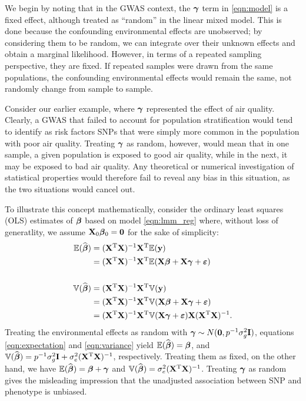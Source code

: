 We begin by noting that in the GWAS context, the $\boldsymbol{\gamma}$ term in \eqref{eqn:model} is a fixed effect, although treated as ``random'' in the linear mixed model.  This is done because the confounding environmental effects are unobserved; by considering them to be random, we can integrate over their unknown effects and obtain a marginal likelihood.  However, in terms of a repeated sampling perspective, they are fixed.  If repeated samples were drawn from the same populations, the confounding environmental effects would remain the same, not randomly change from sample to sample.  

Consider our earlier example, where $\boldsymbol{\gamma}$ represented the effect of air quality.  Clearly, a GWAS that failed to account for population stratification would tend to identify as risk factors SNPs that were simply more common in the population with poor air quality.  Treating $\boldsymbol{\gamma}$ as random, however, would mean that in one sample, a given population is exposed to good air quality, while in the next, it may be exposed to bad air quality.  Any theoretical or numerical investigation of statistical properties would therefore fail to reveal any bias in this situation, as the two situations would cancel out.


To illustrate this concept mathematically, consider the ordinary least squares (OLS) estimates of $\boldsymbol{\beta}{}$ based on model \eqref{eqn:lmm_reg} where, without loss of generatlity, we assume $\mathbf{X}_0 \boldsymbol{\beta}{}_0 = \boldsymbol{0}$ for the sake of simplicity: 
\begin{align}
    \mathbb{E}(\widehat{\boldsymbol{\beta}{}}) &= (\mathbf{X}^{\text{T}} \mathbf{X})^{-1} \mathbf{X}^{\text{T}} \mathbb{E}(\mathbf{y}) \notag \\
    &=  (\mathbf{X}^{\text{T}} \mathbf{X})^{-1} \mathbf{X}^{\text{T}} \mathbb{E}(\mathbf{X}\boldsymbol{\beta}{} + \mathbf{X}\boldsymbol{\gamma} + \boldsymbol{\varepsilon}{}) \label{eqn:expectation}\\
    &\quad \notag\\
    \mathbb{V}(\widehat{\boldsymbol{\beta}{}}) &= (\mathbf{X}^{\text{T}} \mathbf{X})^{-1} \mathbf{X}^{\text{T}} \mathbb{V}(\mathbf{y}) \notag\\
    &=  (\mathbf{X}^{\text{T}} \mathbf{X})^{-1} \mathbf{X}^{\text{T}} \mathbb{V}(\mathbf{X}\boldsymbol{\beta}{} + \mathbf{X}\boldsymbol{\gamma} + \boldsymbol{\varepsilon}{}) \notag\\
    &=  (\mathbf{X}^{\text{T}} \mathbf{X})^{-1} \mathbf{X}^{\text{T}} \mathbb{V}(\mathbf{X}\boldsymbol{\gamma} + \boldsymbol{\varepsilon}{}) \mathbf{X}  (\mathbf{X}^{\text{T}} \mathbf{X})^{-1} \label{eqn:variance}.
\end{align}
Treating the environmental effects as random with $\boldsymbol{\gamma} \sim N(\boldsymbol{0}, p^{-1} \sigma^2_g \mathbf{I})$, equations \eqref{eqn:expectation} and \eqref{eqn:variance} yield $\mathbb{E}(\widehat{\boldsymbol{\beta}{}}) = \boldsymbol{\beta}{}$, and $\mathbb{V}(\widehat{\boldsymbol{\beta}{}}) = p^{-1}\sigma^2_g\mathbf{I} + \sigma^2_e (\mathbf{X}^{\text{T}} \mathbf{X})^{-1}$, respectively. Treating them as fixed, on the other hand, we have $\mathbb{E}(\widehat{\boldsymbol{\beta}{}}) = \boldsymbol{\beta}{} + \boldsymbol{\gamma}$ and $\mathbb{V}(\widehat{\boldsymbol{\beta}{}}) = \sigma^2_e (\mathbf{X}^{\text{T}} \mathbf{X})^{-1}$. Treating $\boldsymbol{\gamma}$ as random gives the misleading impression that the unadjusted association between SNP and phenotype is unbiased.

